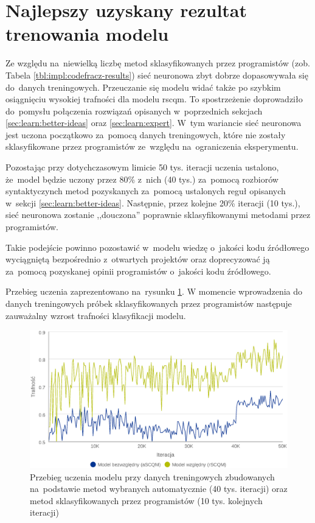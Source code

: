 \documentclass[twoside]{praca}
\begin{document}
\section{Najlepszy uzyskany rezultat trenowania modelu}
\label{sec:learn:best-mix}

Ze względu na~niewielką liczbę metod sklasyfikowanych przez programistów (zob. Tabela \ref{tbl:impl:codefracz-results}) sieć neuronowa zbyt dobrze dopasowywała się do~danych treningowych. Przeuczanie się modelu widać także po szybkim osiągnięciu wysokiej trafności dla modelu \gls{rscqm}. To spostrzeżenie doprowadziło do~pomysłu połączenia rozwiązań opisanych w~poprzednich sekcjach \ref{sec:learn:better-ideas} oraz \ref{sec:learn:expert}. W~tym wariancie sieć neuronowa jest uczona początkowo za~pomocą danych treningowych, które nie zostały sklasyfikowane przez programistów ze~względu na~ograniczenia eksperymentu.

Pozostając przy dotychczasowym limicie 50 tys. iteracji uczenia ustalono, że~model będzie uczony przez 80\% z~nich (40 tys.) za~pomocą rozbiorów syntaktyczynch metod pozyskanych za~pomocą ustalonych reguł opisanych w~sekcji \ref{sec:learn:better-ideas}. Następnie, przez kolejne 20\% iteracji (10 tys.), sieć neuronowa zostanie ,,douczona'' poprawnie sklasyfikowanymi metodami przez programistów.

Takie podejście powinno pozostawić w~modelu wiedzę o~jakości kodu źródłowego wyciągniętą bezpośrednio z~otwartych projektów oraz doprecyzować ją za~pomocą pozyskanej opinii programistów o~jakości kodu źródłowego.

Przebieg uczenia zaprezentowano na~rysunku \ref{fig:learn:best-mix}. W momencie wprowadzenia do danych treningowych próbek sklasyfikowanych przez programistów następuje zauważalny wzrost trafności klasyfikacji modelu.

\begin{figure}[h!]
\centering
\includegraphics[width=\textwidth]{learn/bestmix.eps}
\caption{Przebieg uczenia modelu przy danych treningowych zbudowanych na~podstawie metod wybranych automatycznie (40 tys. iteracji) oraz metod sklasyfikowanych przez programistów (10 tys. kolejnych iteracji)}
\label{fig:learn:best-mix}
\end{figure}
\end{document}
